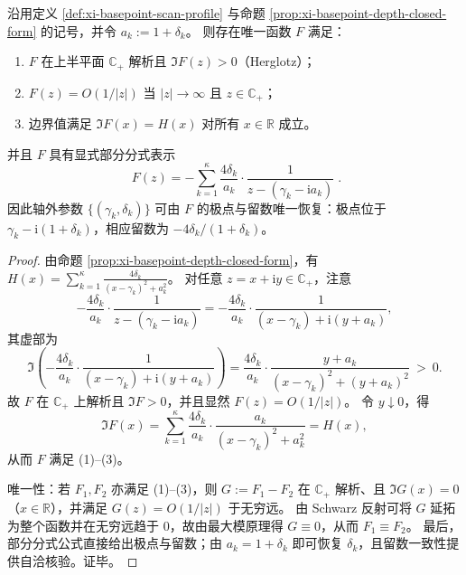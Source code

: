 \begin{theorem}\label{thm:xi-basepoint-scan-rational-herglotz-pole-tomography}
沿用定义 \ref{def:xi-basepoint-scan-profile} 与命题 \ref{prop:xi-basepoint-depth-closed-form} 的记号，并令 \(a_k:=1+\delta_k\)。
则存在唯一函数 \(F\) 满足：
\begin{enumerate}
  \item \(F\) 在上半平面 \(\mathbb{C}_{+}\) 解析且 \(\Im F(z)>0\)（Herglotz）；
  \item \(F(z)=O(1/|z|)\) 当 \(|z|\to\infty\) 且 \(z\in\mathbb{C}_{+}\)；
  \item 边界值满足 \(\Im F(x)=H(x)\) 对所有 \(x\in\mathbb{R}\) 成立。
\end{enumerate}
并且 \(F\) 具有显式部分分式表示
\[
\boxed{\;
F(z)=
-\sum_{k=1}^{\kappa}\frac{4\delta_k}{a_k}\cdot\frac{1}{z-(\gamma_k-\mathrm{i}a_k)}\; }.
\]
因此轴外参数 \(\{(\gamma_k,\delta_k)\}\) 可由 \(F\) 的极点与留数唯一恢复：极点位于 \(\gamma_k-\mathrm{i}(1+\delta_k)\)，相应留数为 \(-4\delta_k/(1+\delta_k)\)。
\end{theorem}
\begin{proof}
由命题 \ref{prop:xi-basepoint-depth-closed-form}，有
\(
H(x)=\sum_{k=1}^{\kappa}\frac{4\delta_k}{(x-\gamma_k)^2+a_k^2}
\)。
对任意 \(z=x+\mathrm{i}y\in\mathbb{C}_{+}\)，注意
\[
-\frac{4\delta_k}{a_k}\cdot\frac{1}{z-(\gamma_k-\mathrm{i}a_k)}
=-\frac{4\delta_k}{a_k}\cdot\frac{1}{(x-\gamma_k)+\mathrm{i}(y+a_k)},
\]
其虚部为
\[
\Im\!\left(-\frac{4\delta_k}{a_k}\cdot\frac{1}{(x-\gamma_k)+\mathrm{i}(y+a_k)}\right)
=\frac{4\delta_k}{a_k}\cdot\frac{y+a_k}{(x-\gamma_k)^2+(y+a_k)^2}\ >\ 0.
\]
故 \(F\) 在 \(\mathbb{C}_{+}\) 上解析且 \(\Im F>0\)，并且显然 \(F(z)=O(1/|z|)\)。
令 \(y\downarrow 0\)，得
\[
\Im F(x)
=\sum_{k=1}^{\kappa}\frac{4\delta_k}{a_k}\cdot\frac{a_k}{(x-\gamma_k)^2+a_k^2}
=H(x),
\]
从而 \(F\) 满足 (1)--(3)。
\par
唯一性：若 \(F_1,F_2\) 亦满足 (1)--(3)，则 \(G:=F_1-F_2\) 在 \(\mathbb{C}_{+}\) 解析、且 \(\Im G(x)=0\)（\(x\in\mathbb{R}\)），并满足 \(G(z)=O(1/|z|)\) 于无穷远。
由 Schwarz 反射可将 \(G\) 延拓为整个函数并在无穷远趋于 \(0\)，故由最大模原理得 \(G\equiv 0\)，从而 \(F_1\equiv F_2\)。
最后，部分分式公式直接给出极点与留数；由 \(a_k=1+\delta_k\) 即可恢复 \(\delta_k\)，且留数一致性提供自洽核验。证毕。
\end{proof}


